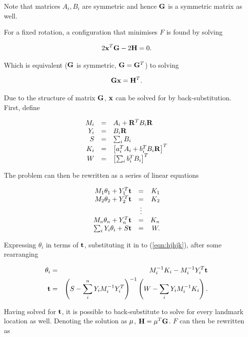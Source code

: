 Note that matrices $A_i,B_i$ are symmetric and hence ${\bf G}$ is a
symmetric matrix as well.

For a fixed rotation, a configuration that minimises $F$ is found by
solving

$$
2{\bf x}^T{\bf G} - 2{\bf H} = 0.
$$

Which is equivalent (${\bf G}$ is symmetric, ${\bf G} = {\bf G}^T$) to
solving

$$
 {\bf Gx} = {\bf H}^T.
$$

Due to the structure of matrix ${\bf G}$, ${\bf x}$ can be solved for
by back-substitution. First, define

\begin{equation}
\begin{array}{rcl}
M_i &=& A_i + {\bf R}^TB_i{\bf R}\\
Y_i &=& B_i{\bf R}\\
S   &=& \sum_i B_i \\
K_i &=& \left[a_i^TA_i + b_i^TB_i{\bf R}\right]^T\\
W   &=& \left[ \sum_i b_i^TB_i \right]^T
\end{array}
\end{equation}

The problem can then be rewritten as a series of linear equations

\begin{equation}
\begin{array}{rcr}
M_1\theta_1 + Y_1^T{\bf t} &=& K_1\\
M_2\theta_2 + Y_2^T{\bf t} &=& K_2\\
&\vdots&\\
M_n\theta_n + Y_n^T{\bf t} &=& K_n\\
\sum_i Y_i\theta_i + S{\bf t} &=& W.
\end{array}
\label{eqn:hjhjk}
\end{equation}

Expressing $\theta_i$ in terms of ${\bf t}$, substituting it in to
(\ref{eqn:hjhjk}), after some rearranging 

\begin{eqnarray}
\theta_i &=& M_i^{-1}K_i - M_i^{-1}Y_i^T{\bf t}\\
{\bf t} &=& \left( S -\sum_i^n Y_iM_i^{-1}Y_i^T \right)^{-1}
\left(W - \sum_i Y_iM_i^{-1}K_i \right).
\end{eqnarray}

Having solved for ${\bf t}$, it is possible to back-substitute to
solve for every landmark location as well. Denoting the solution as
${\bf \mu}$, ${\bf H}={\bf \mu}^T{\bf G}$. $F$ can then be rewritten
as

